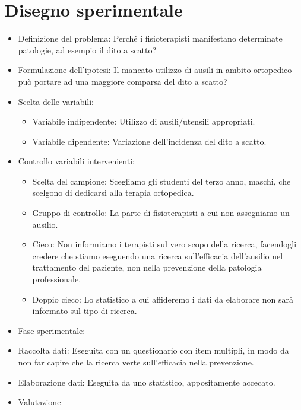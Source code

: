 \section{Disegno sperimentale}
\begin{itemize}
\item Definizione del problema: Perché i fisioterapisti manifestano determinate patologie, ad esempio il dito a scatto?
\item Formulazione dell'ipotesi: Il mancato utilizzo di ausili in ambito ortopedico può portare ad una maggiore comparsa del dito a scatto?
\item Scelta delle variabili:
\begin{itemize}
\item Variabile indipendente: Utilizzo di ausili/utensili appropriati.
\item Variabile dipendente: Variazione dell'incidenza del dito a scatto.
\end{itemize}
\item Controllo variabili intervenienti:
\begin{itemize}
\item Scelta del campione: Scegliamo gli studenti del terzo anno, maschi, che scelgono di dedicarsi alla terapia ortopedica.
\item Gruppo di controllo: La parte di fisioterapisti a cui non assegniamo un ausilio.
\item Cieco: Non informiamo i terapisti sul vero scopo della ricerca, facendogli credere che stiamo eseguendo una ricerca sull'efficacia dell'ausilio nel trattamento del paziente, non nella prevenzione della patologia professionale.
\item Doppio cieco: Lo statistico a cui affideremo i dati da elaborare non sarà informato sul tipo di ricerca.
\end{itemize}
\item Fase sperimentale: 
\item Raccolta dati: Eseguita con un questionario con item multipli, in modo da non far capire che la ricerca verte sull'efficacia nella prevenzione.
\item Elaborazione dati: Eseguita da uno statistico, appositamente accecato.
\item Valutazione
\end{itemize}